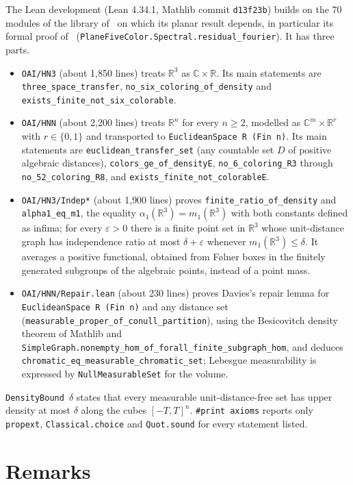 \documentclass[11pt]{amsart}
\theoremstyle{definition}
\newcommand{\R}{\mathbb{R}}
\newcommand{\C}{\mathbb{C}}
\begin{document}
The Lean development (Lean 4.34.1, Mathlib commit \texttt{d13f23b}) builds on the 70 modules of the library of~\cite{OAI} on which its planar result depends, in particular its formal proof of~\cite[Theorem 2.3]{OAI} (\texttt{PlaneFiveColor.Spectral.residual\_fourier}). It has three parts.
\begin{itemize}
\item \texttt{OAI/HN3} (about 1{,}850 lines) treats $\R^3$ as $\C\times\R$. Its main statements are \texttt{three\_space\_transfer}, \texttt{no\_six\_coloring\_of\_density} and \texttt{exists\_finite\_not\_six\_colorable}.
\item \texttt{OAI/HNN} (about 2{,}200 lines) treats $\R^n$ for every $n\ge2$, modelled as $\C^m\times\R^r$ with $r\in\{0,1\}$ and transported to \texttt{EuclideanSpace R (Fin n)}. Its main statements are \texttt{euclidean\_transfer\_set} (any countable set $D$ of positive algebraic distances), \texttt{colors\_ge\_of\_densityE}, \texttt{no\_6\_coloring\_R3} through \texttt{no\_52\_coloring\_R8}, and \texttt{exists\_finite\_not\_colorableE}.
\item \texttt{OAI/HN3/Indep*} (about 1{,}900 lines) proves \texttt{finite\_ratio\_of\_density} and \texttt{alpha1\_eq\_m1}, the equality $\alpha_1(\R^3)=m_1(\R^3)$ with both constants defined as infima; for every $\varepsilon>0$ there is a finite point set in $\R^3$ whose unit-distance graph has independence ratio at most $\delta+\varepsilon$ whenever $m_1(\R^3)\le\delta$. It averages a positive functional, obtained from F\o lner boxes in the finitely generated subgroups of the algebraic points, instead of a point mass.

\item \texttt{OAI/HNN/Repair.lean} (about 230 lines) proves Davies's repair lemma for \texttt{EuclideanSpace R (Fin n)} and any distance set (\texttt{measurable\_proper\_of\_conull\_partition}), using the Besicovitch density theorem of Mathlib and \texttt{SimpleGraph.nonempty\_hom\_of\_forall\_finite\_subgraph\_hom}, and deduces \texttt{chromatic\_eq\_measurable\_chromatic\_set}; Lebesgue measurability is expressed by \texttt{NullMeasurableSet} for the volume.
\end{itemize}
\texttt{DensityBound}~$\delta$ states that every measurable unit-distance-free set has upper density at most $\delta$ along the cubes $[-T,T]^n$. \texttt{\#print axioms} reports only \texttt{propext}, \texttt{Classical.choice} and \texttt{Quot.sound} for every statement listed.

\section{Remarks}\label{sec:remarks}
\end{document}
